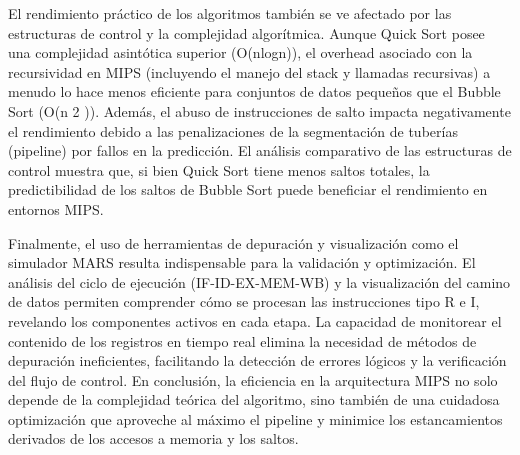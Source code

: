 \documentclass{article}
\begin{document}
El rendimiento práctico de los algoritmos también se ve afectado por las estructuras de control y la complejidad algorítmica. Aunque Quick Sort posee una complejidad asintótica superior (O(nlogn)), el overhead asociado con la recursividad en MIPS (incluyendo el manejo del stack y llamadas recursivas) a menudo lo hace menos eficiente para conjuntos de datos pequeños que el Bubble Sort (O(n 
2
 )). Además, el abuso de instrucciones de salto impacta negativamente el rendimiento debido a las penalizaciones de la segmentación de tuberías (pipeline) por fallos en la predicción. El análisis comparativo de las estructuras de control muestra que, si bien Quick Sort tiene menos saltos totales, la predictibilidad de los saltos de Bubble Sort puede beneficiar el rendimiento en entornos MIPS.

Finalmente, el uso de herramientas de depuración y visualización como el simulador MARS resulta indispensable para la validación y optimización. El análisis del ciclo de ejecución (IF-ID-EX-MEM-WB) y la visualización del camino de datos permiten comprender cómo se procesan las instrucciones tipo R e I, revelando los componentes activos en cada etapa. La capacidad de monitorear el contenido de los registros en tiempo real elimina la necesidad de métodos de depuración ineficientes, facilitando la detección de errores lógicos y la verificación del flujo de control. En conclusión, la eficiencia en la arquitectura MIPS no solo depende de la complejidad teórica del algoritmo, sino también de una cuidadosa optimización que aproveche al máximo el pipeline y minimice los estancamientos derivados de los accesos a memoria y los saltos.
\end{document}
